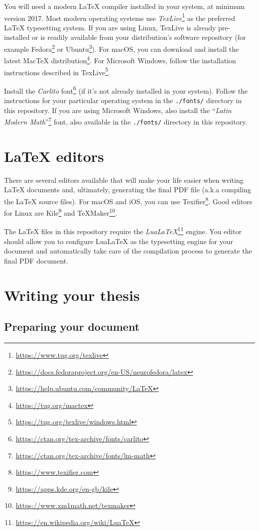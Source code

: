 You will need a modern LaTeX compiler installed in your system, at minimum version 2017. Most modern operating systems use \textit{TexLive}\footnote{\url{https://www.tug.org/texlive}} as the preferred LaTeX typesetting system. If you are using Linux, TexLive is already pre-installed or is readily 
available from your distribution's software repository (for example Fedora\footnote{\url{https://docs.fedoraproject.org/en-US/neurofedora/latex}} or Ubuntu\footnote{\url{https://help.ubuntu.com/community/LaTeX}}). For macOS, you can download and install the latest MacTeX distribution\footnote{\url{https://tug.org/mactex}}. For Microsoft Windows, follow the installation instructions described in TexLive\footnote{\url{https://tug.org/texlive/windows.html}}.

Install the \textit{Carlito} font\footnote{\url{https://ctan.org/tex-archive/fonts/carlito}} (if it's not already installed in your system). Follow the instructions for your particular operating system in the \verb|./fonts/| directory in this repository. If you are using Microsoft Windows, also install the ``\textit{Latin Modern Math}''\footnote{\url{https://ctan.org/tex-archive/fonts/lm-math}} font, also available in the \verb|./fonts/| directory in this repository.


\section{LaTeX editors}


There are several editors available that will make your life easier when writing LaTeX documents and, ultimately, generating the final PDF file (a.k.a compiling the LaTeX source files). For macOS and iOS, you can use Texifier\footnote{\url{https://www.texifier.com}}. Good editors for Linux are Kile\footnote{\url{https://apps.kde.org/en-gb/kile}} and TeXMaker\footnote{\url{https://www.xm1math.net/texmaker}}.

The LaTeX files in this repository require the \textit{LuaLaTeX}\footnote{\url{https://en.wikipedia.org/wiki/LuaTeX}} engine. You editor should allow you to configure LuaLaTeX as the typesetting engine for your document and automatically take care of the compilation process to generate the final PDF document.


\section{Writing your thesis}


\subsection{Preparing your document}

